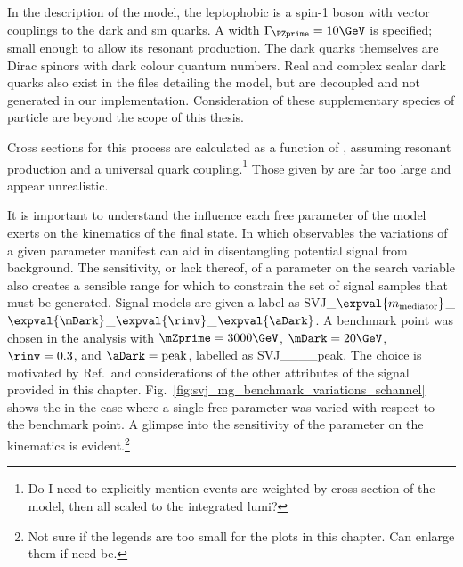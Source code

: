 

\subsection{\texorpdfstring{\schannel}{s-channel}}
\label{subsec:svj_signal_madgraph_schannel}

In the description of the \schannel model, the leptophobic \PZprime is a spin-1 boson with vector couplings to the dark and \acrshort{sm} quarks. A width $\Gamma_{\PZprime} = \text{10}\GeV$ is specified; small enough to allow its resonant production. The dark quarks themselves are Dirac spinors with dark colour quantum numbers. Real and complex scalar dark quarks also exist in the files detailing the model, but are decoupled and not generated in our implementation. Consideration of these supplementary species of particle are beyond the scope of this thesis.

Cross sections for this process are calculated as a function of \mZprime, assuming resonant production and a universal quark coupling.\footnote{Do I need to explicitly mention events are weighted by cross section of the model, then all scaled to the integrated lumi?} Those given by \MADGRAPH are far too large and appear unrealistic. %

It is important to understand the influence each free parameter of the model exerts on the kinematics of the final state. In which observables the variations of a given parameter manifest can aid in disentangling potential signal from background. The sensitivity, or lack thereof, of a parameter on the search variable also creates a sensible range for which to constrain the set of signal samples that must be generated. Signal models are given a label as SVJ\_\-$\expval{m_{\mathrm{mediator}}}$\_\-$\expval{\mDark}$\_\-$\expval{\rinv}$\_\-$\expval{\aDark}$. A benchmark point was chosen in the analysis with $\mZprime = \text{3000}\GeV$, $\mDark = \text{20}\GeV$, $\rinv = \text{0.3}$, and $\aDark = \text{peak}$, labelled as SVJ\_\_\_\_\-peak. The choice is motivated by Ref.~and considerations of the other attributes of the signal provided in this chapter. Fig.~\ref{fig:svj_mg_benchmark_variations_schannel} shows the \mT in the case where a single free parameter was varied with respect to the benchmark point. A glimpse into the sensitivity of the parameter on the kinematics is evident.\footnote{Not sure if the legends are too small for the plots in this chapter. Can enlarge them if need be.}

